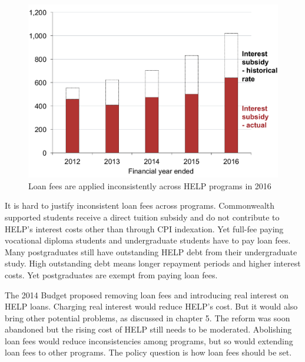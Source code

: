 \documentclass[embargoed]{grattan}
\begin{document}
\begin{figure}
\caption{Loan fees are applied inconsistently across HELP programs in 2016}\label{fig:fig19-loan-fees-are-applied-inconsitently-across-HELP-programs-2016}

\includegraphics[page=19]{atlas/Chartpack.pdf}

\end{figure}

It is hard to justify inconsistent loan fees across programs.
Commonwealth supported students receive a direct tuition subsidy and do not contribute to HELP's interest costs other than through \gls{CPI} indexation.
Yet full-fee paying vocational diploma students and undergraduate students have to pay loan fees.
Many postgraduates still have outstanding HELP debt from their undergraduate study.
High outstanding debt means longer repayment periods and higher interest costs.
Yet postgraduates are exempt from paying loan fees.

The 2014 Budget proposed removing loan fees and introducing real interest on HELP loans.
Charging real interest would reduce HELP's cost.
But it would also bring other potential problems, as discussed in chapter 5.
The reform was soon abandoned but the rising cost of HELP still needs to be moderated.
Abolishing loan fees would reduce inconsistencies among programs, but so would extending loan fees to other programs.
The policy question is how loan fees should be set.
\end{document}
